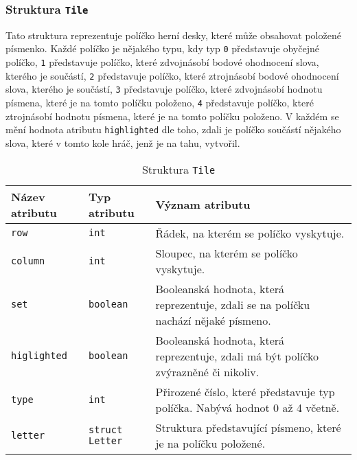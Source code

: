 \documentclass[12pt, a4paper]{article}
\begin{document}
\subsubsection{Struktura \texttt{Tile}}
Tato struktura reprezentuje políčko herní desky, které může obsahovat položené písmenko. Každé políčko je nějakého typu, kdy typ \texttt{0} představuje obyčejné políčko, \texttt{1} představuje políčko, které zdvojnásobí bodové ohodnocení slova, kterého je součástí, \texttt{2} představuje políčko, které ztrojnásobí bodové ohodnocení slova, kterého je součástí, \texttt{3} představuje políčko, které zdvojnásobí hodnotu písmena, které je na tomto políčku položeno, \texttt{4} představuje políčko, které ztrojnásobí hodnotu písmena, které je na tomto políčku položeno. V každém se mění hodnota atributu \texttt{highlighted} dle toho, zdali je políčko součástí nějakého slova, které v tomto kole hráč, jenž je na tahu, vytvořil.
\begin{center}
		\begin{table}[!ht]
		     \caption{Struktura \texttt{Tile}}
		\begin{tabularx}{\textwidth}{|l|l|X|}
			\hline
			\textbf{Název atributu} & \textbf{Typ atributu} & \textbf{Význam atributu} \\ 
			\hline
			\texttt{row}          &\texttt{int}&Řádek, na kterém se políčko vyskytuje. \\
			\hline
  			\texttt{column}          &\texttt{int}&Sloupec, na kterém se políčko vyskytuje. \\
			\hline
			\texttt{set}          &\texttt{boolean}&Booleanská hodnota, která reprezentuje, zdali se na políčku nachází nějaké písmeno.\\
			\hline
			\texttt{higlighted}          &\texttt{boolean}&Booleanská hodnota, která reprezentuje, zdali má být políčko zvýrazněné či nikoliv.\\
			\hline
			\texttt{type}          &\texttt{int}&Přirozené číslo, které představuje typ políčka. Nabývá hodnot 0 až 4 včetně.\\
			\texttt{letter}          &\texttt{struct Letter}&Struktura představující písmeno, které je na políčku položené.\\
			\hline
		\end{tabularx}
		\end{table}
\end{center}  
\end{document}
